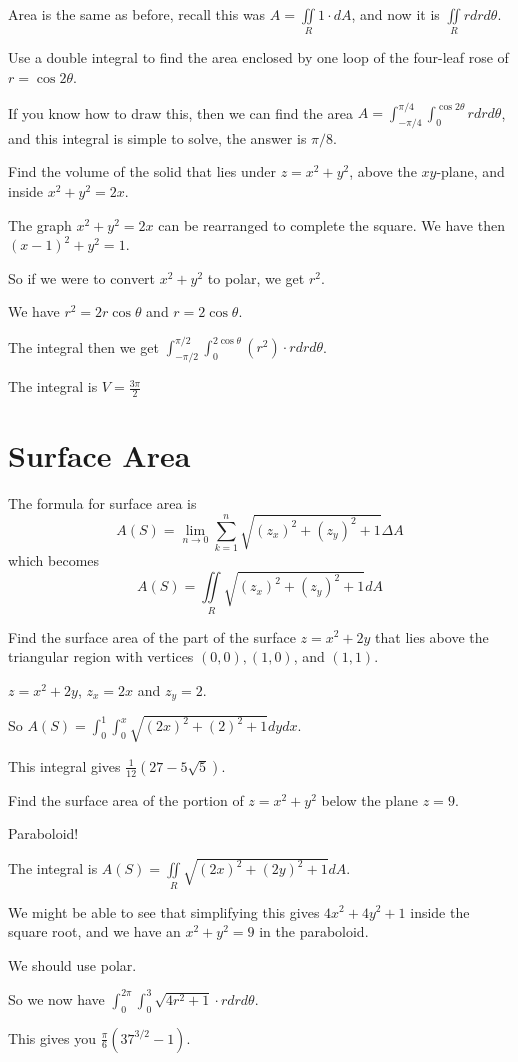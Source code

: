 \documentclass[../calc3.tex]{subfiles}
\begin{document}
Area is the same as before, recall this was $A=\iint\limits_{R} 1\cdot dA$, and now it is $\iint\limits_{R} r dr d\theta$.

\begin{example}
    Use a double integral to find the area enclosed by one loop of the four-leaf rose of $r=\cos2\theta$.

    If you know how to draw this, then we can find the area $A=\int_{-\pi/4}^{\pi/4}\int_0^{\cos 2\theta}rdrd\theta$, and this integral is simple to solve, the answer is $\pi/8$.
\end{example}

\begin{example}
    Find the volume of the solid that lies under $z=x^2+y^2$, above the $xy$-plane, and inside $x^2+y^2=2x$.

    The graph $x^2+y^2=2x$ can be rearranged to complete the square. We have then $(x-1)^2+y^2=1$.

    So if we were to convert $x^2+y^2$ to polar, we get $r^2$.

    We have $r^2=2r\cos\theta$ and $r=2\cos\theta$.

    The integral then we get $\int_{-\pi/2}^{\pi/2} \int_0^{2\cos\theta} (r^2)\cdot rdrd\theta$.

    The integral is $V=\frac{3\pi}{2}$
\end{example}

\section{Surface Area}
The formula for surface area is 
\[ A(S)=\lim_{n\to 0}\sum_{k=1}^n \sqrt{(z_x)^2+(z_y)^2+1}\Delta A\]
which becomes 
\[ A(S)=\iint\limits_{R} \sqrt{(z_x)^2+(z_y)^2+1}dA \]

\begin{example}
    Find the surface area of the part of the surface $z=x^2+2y$ that lies above the triangular region with vertices $(0,0), (1,0)$, and $(1,1)$.

    $z=x^2+2y$, $z_x=2x$ and $z_y=2$.

    So $A(S)=\int_0^1 \int_0^x \sqrt{(2x)^2+(2)^2+1} dydx$.

    This integral gives $\frac{1}{12}(27-5\sqrt{5})$.
\end{example}

\begin{example}
    Find the surface area of the portion of $z=x^2+y^2$ below the plane $z=9$.

    Paraboloid!

    The integral is $A(S)=\iint\limits_{R} \sqrt{(2x)^2+(2y)^2+1}dA$.

    We might be able to see that simplifying this gives $4x^2+4y^2+1$ inside the square root, and we have an $x^2+y^2=9$ in the paraboloid.

    We should use polar.

    So we now have $\int_0^{2\pi}\int_0^3 \sqrt{4r^2+1}\cdot r dr d\theta$.

    This gives you $\frac{\pi}{6}(37^{3/2}-1)$.
\end{example}
\end{document}
